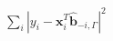\documentclass[10pt]{article}
\begin{document}
\begin{align*}\sum_i \left| y_i - \boldsymbol{x}_i^T \boldsymbol{\hat{b}}_{-i,\Gamma} \right|^2\end{align*}
\end{document}
